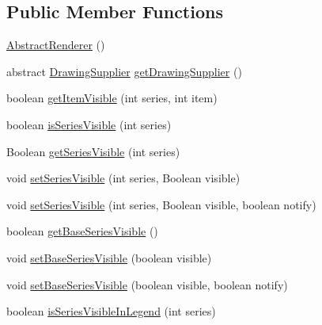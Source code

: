 \subsection*{Public Member Functions}
\begin{DoxyCompactItemize}
\item 
\mbox{\hyperlink{classorg_1_1jfree_1_1chart_1_1renderer_1_1_abstract_renderer_a272d66a38a9ce6f18eafbdbd594aff9d}{Abstract\+Renderer}} ()
\item 
abstract \mbox{\hyperlink{interfaceorg_1_1jfree_1_1chart_1_1plot_1_1_drawing_supplier}{Drawing\+Supplier}} \mbox{\hyperlink{classorg_1_1jfree_1_1chart_1_1renderer_1_1_abstract_renderer_a9c1b17b997d4a8c8c70a58e4a1c4d237}{get\+Drawing\+Supplier}} ()
\item 
boolean \mbox{\hyperlink{classorg_1_1jfree_1_1chart_1_1renderer_1_1_abstract_renderer_a28b63ce0af9ca244a38261f381c0d971}{get\+Item\+Visible}} (int series, int item)
\item 
boolean \mbox{\hyperlink{classorg_1_1jfree_1_1chart_1_1renderer_1_1_abstract_renderer_aa972c5c461d3124942180db93f33ac35}{is\+Series\+Visible}} (int series)
\item 
Boolean \mbox{\hyperlink{classorg_1_1jfree_1_1chart_1_1renderer_1_1_abstract_renderer_a4807cc403de1b6e06fcbbdebee5b5ed4}{get\+Series\+Visible}} (int series)
\item 
void \mbox{\hyperlink{classorg_1_1jfree_1_1chart_1_1renderer_1_1_abstract_renderer_a4311b798698e141c2fb2deb6a412283f}{set\+Series\+Visible}} (int series, Boolean visible)
\item 
void \mbox{\hyperlink{classorg_1_1jfree_1_1chart_1_1renderer_1_1_abstract_renderer_a87c940f828a45ded1b54f3ea12785060}{set\+Series\+Visible}} (int series, Boolean visible, boolean notify)
\item 
boolean \mbox{\hyperlink{classorg_1_1jfree_1_1chart_1_1renderer_1_1_abstract_renderer_a854c652505643472b823747703d8b3ca}{get\+Base\+Series\+Visible}} ()
\item 
void \mbox{\hyperlink{classorg_1_1jfree_1_1chart_1_1renderer_1_1_abstract_renderer_af5e2fb8863761c1e74ff957a7c13ba78}{set\+Base\+Series\+Visible}} (boolean visible)
\item 
void \mbox{\hyperlink{classorg_1_1jfree_1_1chart_1_1renderer_1_1_abstract_renderer_a24e78cc47b075c08855425bdfd8d5def}{set\+Base\+Series\+Visible}} (boolean visible, boolean notify)
\item 
boolean \mbox{\hyperlink{classorg_1_1jfree_1_1chart_1_1renderer_1_1_abstract_renderer_acdf46f032810ca5b9c467ab47a8ad087}{is\+Series\+Visible\+In\+Legend}} (int series)

\end{DoxyCompactItemize}
